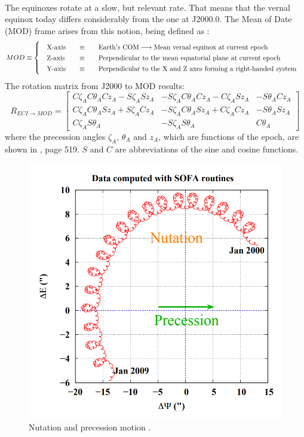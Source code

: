 		\paragraph{ }
		\subparagraph{ \\}
		\indent The equinoxes rotate at a slow, but relevant rate. That means that the vernal equinox today differs considerably from the one at J2000.0. The Mean of Date (MOD) frame arises from this notion, being defined as \cite{Tapley}: \\
		\[
		\arraycolsep=10pt
		\def\arraystretch{1.3}
		MOD\equiv\left\{
		\begin{array}{lll}
		\text{X-axis} 	& \equiv 	& \text{Earth's COM} \longrightarrow \text{Mean vernal equinox at current epoch} \\
		\text{Z-axis} 	& \equiv 	& \text{Perpendicular to the mean equatorial plane at current epoch} \\
		\text{Y-axis} 	& \equiv 	& \text{Perpendicular to the X and Z axes forming a right-handed system} \\
		\end{array}
		\right.
		\]
		\indent The rotation matrix from J2000 to MOD results:
		\begin{equation}
		R_{ECI\rightarrow MOD} = 
		\left[ 
		\begin{array}{ccc}
		C \zeta_A C \theta_A C z_A - S \zeta_A S z_A 	& - S \zeta_A C \theta_A C z_A - C \zeta_A S z_A 	& -S \theta_A C z_A \\
		C \zeta_A C \theta_A S z_A + S \zeta_A C z_A 	& - S \zeta_A C \theta_A S z_A + C \zeta_A C z_A 	& -S \theta_A S z_A \\
 		C \zeta_A S \theta_A 							& - S \zeta_A S \theta_A 							& C \theta_A
		\end{array}
		\right]
		\label{eq: R_ECI_MOD}
		\end{equation}
		\noindent where the precession angles $\zeta_A$, $\theta_A$ and $z_A$, which are functions of the epoch, are shown in \cite{Tapley}, page 519. $S$ and $C$ are abbreviations of the sine and cosine functions.
		\begin{figure}[!htb]
		\centering\includegraphics[width = 0.4\linewidth]{Appendices/Appendix_B/Nut_prec}
		\caption{Nutation and precession motion \cite{DinVu}.}
		\label{fig:	Nut_prec}
		\end{figure}
